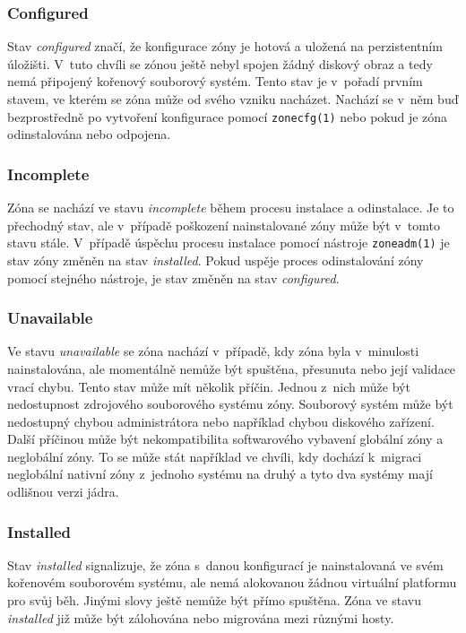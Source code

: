 \subsubsection{Configured}
\label{chapter:zones:administration:states:configured}
Stav \textit{configured} značí, že konfigurace zóny je hotová a uložená na perzistentním úložišti. V~tuto chvíli se zónou
ještě nebyl spojen žádný diskový obraz a tedy nemá připojený kořenový souborový systém. Tento stav je v~pořadí prvním stavem,
ve kterém se zóna může od svého vzniku nacházet. Nachází se v~něm buď bezprostředně po vytvoření konfigurace pomocí \verb|zonecfg(1)|
nebo pokud je zóna odinstalována nebo odpojena.
\subsubsection{Incomplete}
\label{chapter:zones:administration:states:incomplete}
Zóna se nachází ve stavu \textit{incomplete} během procesu instalace a odinstalace. Je to přechodný stav, ale v~případě poškození
nainstalované zóny může být v~tomto stavu stále. V~případě úspěchu procesu instalace pomocí nástroje \verb|zoneadm(1)| je 
stav zóny změněn na stav \textit{installed}. Pokud uspěje proces odinstalování zóny pomocí stejného nástroje, je stav
změněn na stav \textit{configured}.
\subsubsection{Unavailable}
\label{chapter:zones:administration:states:unavailable}
Ve stavu \textit{unavailable} se zóna nachází v~případě, kdy zóna byla v~minulosti nainstalována, ale momentálně nemůže být
spuštěna, přesunuta nebo její validace vrací chybu. Tento stav může mít několik příčin. Jednou z~nich může být nedostupnost
zdrojového souborového systému zóny. Souborový systém může být nedostupný chybou administrátora nebo například chybou diskového
zařízení. Další příčinou může být nekompatibilita softwarového vybavení globální zóny a neglobální zóny. To se může stát například
ve chvíli, kdy dochází k~migraci neglobální nativní zóny z~jednoho systému na druhý a tyto dva systémy mají odlišnou verzi jádra.
\subsubsection{Installed}
\label{chapter:zones:administration:states:installed}
Stav \textit{installed} signalizuje, že zóna s~danou konfigurací je nainstalovaná ve svém kořenovém souborovém systému,
ale nemá alokovanou žádnou virtuální platformu pro svůj běh. Jinými slovy ještě nemůže být přímo spuštěna. Zóna ve stavu
\textit{installed} již může být zálohována nebo migrována mezi různými hosty. 
